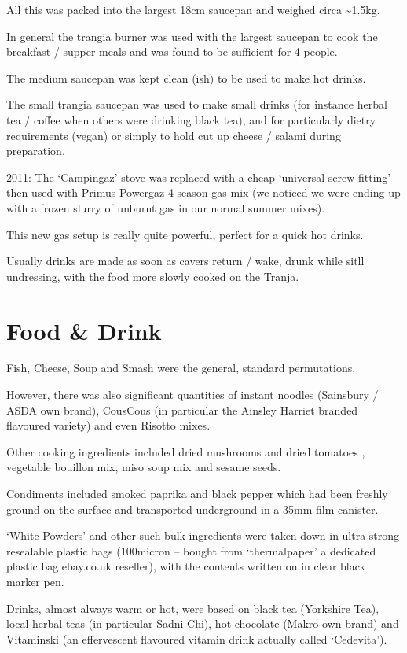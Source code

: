 All this was packed into the largest 18cm saucepan and weighed circa
\textasciitilde{}1.5kg.

In general the trangia burner was used with the largest saucepan to cook
the breakfast / supper meals and was found to be sufficient for 4
people.

The medium saucepan was kept clean (ish) to be used to make hot drinks.

The small trangia saucepan was used to make small drinks (for instance
herbal tea / coffee when others were drinking black tea), and for
particularly dietry requirements (vegan) or simply to hold cut up cheese
/ salami during preparation.

2011: The `Campingaz' stove was replaced with a cheap `universal screw
fitting' then used with Primus Powergaz 4-season gas mix (we noticed we
were ending up with a frozen slurry of unburnt gas in our normal summer
mixes).

This new gas setup is really quite powerful, perfect for a quick hot
drinks.

Usually drinks are made as soon as cavers return / wake, drunk while
sitll undressing, with the food more slowly cooked on the Tranja.


\section{Food \& Drink}

Fish, Cheese, Soup and Smash were the general, standard permutations.

However, there was also significant quantities of instant noodles
(Sainsbury / ASDA own brand), CousCous (in particular the Ainsley
Harriet branded flavoured variety) and even Risotto mixes.

Other cooking ingredients included dried mushrooms and dried tomatoes ,
vegetable bouillon mix, miso soup mix and sesame seeds.

Condiments included smoked paprika and black pepper which had been
freshly ground on the surface and transported underground in a 35mm film
canister.

`White Powders' and other such bulk ingredients were taken down in
ultra-strong resealable plastic bags (100micron -- bought from
`thermalpaper' a dedicated plastic bag ebay.co.uk reseller), with the
contents written on in clear black marker pen.

Drinks, almost always warm or hot, were based on black tea (Yorkshire
Tea), local herbal teas (in particular Sadni Chi), hot chocolate (Makro
own brand) and Vitaminski (an effervescent flavoured vitamin drink
actually called `Cedevita').

